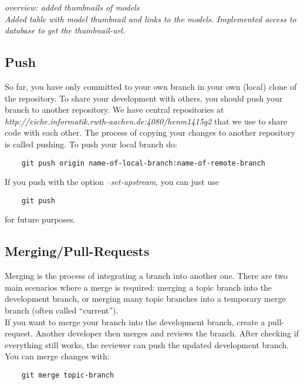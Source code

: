 \documentclass[twoside,12pt,a4paper]{article}
\begin{document}
\emph{overview: added thumbnails of models \\
Added table with model thumbnail and links to the models. Implemented access to database to get the thumbnail-url.}



\subsection{Push}
\label{sub:push}

So far, you have only committed to your own branch in your own (local) clone of the repository. To share your development with others, you should push your branch to another repository. We have central repositories at \emph{http://eiche.informatik.rwth-aachen.de:4080/henm1415g2} that we use to share code with each other. The process of copying your changes to another repository is called pushing. To push your local branch do:

\begin{lstlisting}
	git push origin name-of-local-branch:name-of-remote-branch
\end{lstlisting}

If you push with the option \emph{--set-upstream}, you can just use

\begin{lstlisting}
	git push
\end{lstlisting}

for future purposes.


\subsection{Merging/Pull-Requests}
\label{sub:merging/pull-requests}

Merging is the process of integrating a branch into another one. There are two main scenarios where a merge is required: merging a topic branch into the development branch, or merging many topic branches into a temporary merge branch (often called “current”). \\
If you want to merge your branch into the development branch, create a pull-request. Another developer then merges and reviews the branch. After checking if everything still works, the reviewer can push the updated development branch. \\
You can merge changes with:

\begin{lstlisting}
	git merge topic-branch
\end{lstlisting}
\end{document}
